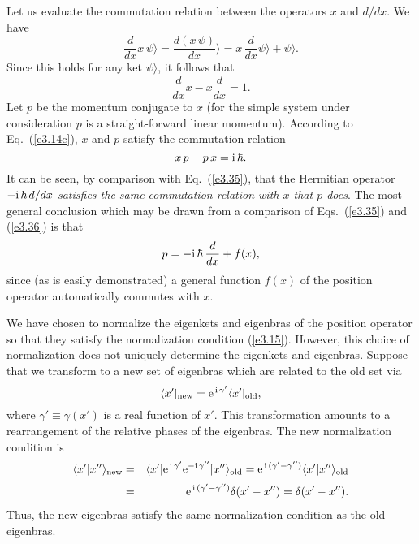 Let us evaluate the commutation relation between the operators $x$ and $d/dx$.
We have
\begin{equation}
\frac{d}{dx} x\, \psi\rangle = \frac{d (x\,\psi)}{dx}\rangle = x\,\frac{d}{dx}\psi\rangle
+ \psi\rangle.
\end{equation}
Since this holds for any ket $\psi\rangle$, it follows that
\begin{equation}\label{e3.35}
\frac{d}{dx} x - x \frac{d}{dx} = 1.
\end{equation}
Let $p$ be the momentum conjugate to $x$
 (for the simple system under consideration
 $p$ is a straight-forward linear momentum). According to Eq.~(\ref{e3.14c}),
$x$ and $p$ satisfy the commutation relation
\begin{equation}\label{e3.36}
x\,p - p\,x = {\rm i} \,\hbar.
\end{equation}
It can be seen, by comparison with Eq.~(\ref{e3.35}), that 
the Hermitian operator {\em $ -{\rm i}\,\hbar \,d/dx$
satisfies the same commutation relation with $x$ that $p$ does}. 
The most general conclusion which may be drawn from a comparison of Eqs.~(\ref{e3.35})
and (\ref{e3.36}) is that
\begin{equation}\label{e3.37}
p = -{\rm i}\,\hbar\,\frac{d}{dx} + f(x),
\end{equation}
since (as is easily demonstrated) a general function $f(x)$ of the position
operator  automatically commutes with $x$. 

We have chosen to normalize the eigenkets and
eigenbras of the position operator so that they satisfy
the normalization condition (\ref{e3.15}). However, this choice of normalization does not
uniquely determine the eigenkets and
eigenbras. Suppose that we transform to a new
set of eigenbras which are related to the old set via
\begin{equation}\label{e3.38}
\langle x'|_{\rm new} = {\rm e}^{\,{\rm i}\,\gamma'}\langle x'|_{\rm old},
\end{equation}
where $\gamma'\equiv \gamma(x')$ is a real function of $x'$.
This transformation amounts to a rearrangement of the relative
phases of the eigenbras.  The new
normalization condition is
\begin{eqnarray}
\langle x'|x''\rangle_{\rm new} &=& \langle x'| {\rm e}^{\,{\rm i}\,\gamma'}
 {\rm e}^{-{\rm i}\,\gamma''}|x''\rangle_{\rm old} 
= {\rm e}^{\,{\rm i}\,(\gamma'-\gamma'')}
\langle x'|x''\rangle_{\rm old}\nonumber\\[0.5ex]
 &=&{ \rm e}^{\,{\rm i}\,(\gamma'-\gamma'')}\delta(x'-x'')= \delta(x'-x'').
\end{eqnarray}
Thus, the new eigenbras satisfy the same normalization condition
 as the old eigenbras. 


